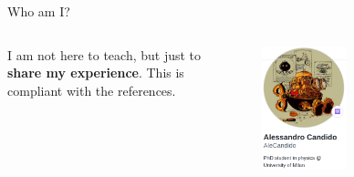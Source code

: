 \documentclass[9pt]{beamer}
\begin{document}
\begin{frame}{Who am I?}
\begin{columns}
\begin{column}{0.5\textwidth}
            I am not here to teach, but just to \textbf{share my experience}.
            This is compliant with the references.
        \end{column}
        \begin{column}{0.5\textwidth}
            \begin{figure}
                \centering
                \includegraphics[width=0.5\textwidth]{mygh}
            \end{figure}
        \end{column}
    \end{columns}
\end{frame}


            
\end{document}

